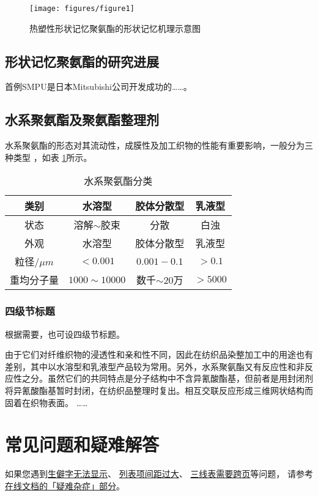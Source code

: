 \begin{figure}[hbt]
 \centering
 \texttt{[image: figures/figure1]}
 \caption{热塑性形状记忆聚氨酯的形状记忆机理示意图}\label{fig:diagram}
\end{figure}


\subsection{形状记忆聚氨酯的研究进展}
首例SMPU是日本Mitsubishi公司开发成功的……。

\subsection{水系聚氨酯及聚氨酯整理剂}

水系聚氨酯的形态对其流动性，成膜性及加工织物的性能有重要影响，一般分为三种类型\cite{Jiang2005Size} ，如表 \ref{tab:category}所示。

\begin{table}[hbt]
  \centering
  \caption{水系聚氨酯分类} \label{tab:category}
  \begin{tabular*}{0.9\textwidth}{@{\extracolsep{\fill}}cccc}
  \toprule
    类别			&水溶型		&胶体分散型		&乳液型 \\
  \midrule
    状态			&溶解$\sim$胶束	&分散		&白浊 \\
    外观			&水溶型		&胶体分散型		&乳液型 \\
    粒径$/\mu m$	&$<0.001$		&$0.001-0.1$		&$>0.1$ \\
    重均分子量	&$1000\sim 10000$	&数千$\sim 20$万 &$>5000$ \\
  \bottomrule
  \end{tabular*}
\end{table}

\subsubsection{四级节标题}

根据需要，也可设四级节标题。

由于它们对纤维织物的浸透性和亲和性不同，因此在纺织品染整加工中的用途也有差别，其中以水溶型和乳液型产品较为常用。另外，水系聚氨酯又有反应性和非反应性之分。虽然它们的共同特点是分子结构中不含异氰酸酯基，但前者是用封闭剂将异氰酸酯基暂时封闭，在纺织品整理时复出。相互交联反应形成三维网状结构而固着在织物表面。
……


\section{常见问题和疑难解答}

如果您遇到\href{https://bithesis.bitnp.net/faq/char-missing.html}{生僻字无法显示}、
\href{https://bithesis.bitnp.net/faq/enumitem-nosep.html}{列表项间距过大}、
\href{https://bithesis.bitnp.net/faq/longtable.html}{三线表需要跨页}等问题，
请参考\textcolor{magenta}{\href{https://bithesis.bitnp.net/faq/}{在线文档的「疑难杂症」部分}}。
